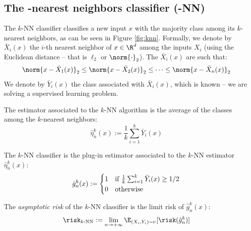 \documentclass[toc, titlepaged]{../cs-classes/cs-classes}
\begin{document}
\subsection{The -nearest neighbors classifier (-NN)}
The $k$-NN classifier classifies a new input $x$ with the majority class among its $k$-nearest neighbors, as can be seen in Figure \ref{fig:knn}. Formally, we denote by $\bar{X}_i(x)$ the $i$-th nearest neighbor of $x\in\R^d$ among the inputs $X_i$ (using the Euclidean distance -- that is $\ell_2$ or $\norm{\cdot}_2$). The $\bar{X}_i(x)$ are such that:
\begin{equation*}
    \norm{x-\bar{X}_1(x)}_2 \leq \norm{x-\bar{X}_2(x)}_2 \leq \dots \leq \norm{x-\bar{X}_n(x)}_2
\end{equation*}
We denote by $\bar{Y}_i(x)$ the class associated with $\bar{X}_i(x)$, which is known -- we are solving a supervised learning problem.

\begin{definition}[$k$-NN estimator]
    The estimator associated to the $k$-NN algorithm is the average of the classes among the $k$-nearest neighbors:
    \begin{equation}
        \hat{\eta}_n^k(x) := \frac{1}{k} \sum_{i=1}^k\bar{Y}_i(x)
    \end{equation}
\end{definition}

\begin{definition}[$k$-NN classifier]
    The $k$-NN classifier is the plug-in estimator associated to the $k$-NN estimator $\hat{\eta}_n^k(x)$:
    \begin{equation}
        \hat{g}_n^k(x) := \begin{cases*}
            1 & if $\frac{1}{k} \sum_{i=1}^k\bar{Y}_i(x)\geq 1/2$\\
            0 & otherwise
        \end{cases*}
    \end{equation}
\end{definition}

\begin{definition}
    The \emph{asymptotic risk} of the $k$-NN classifier is the limit risk of $\hat{g}_n^k(x)$:
    \begin{equation*}
        \risk_{k\textnormal{-NN}} := \lim_{n\to+\infty}\E_{(X_i, Y_i)\sim\nu}[\risk(\hat{g}_n^k)]
    \end{equation*}
\end{definition}
\end{document}
